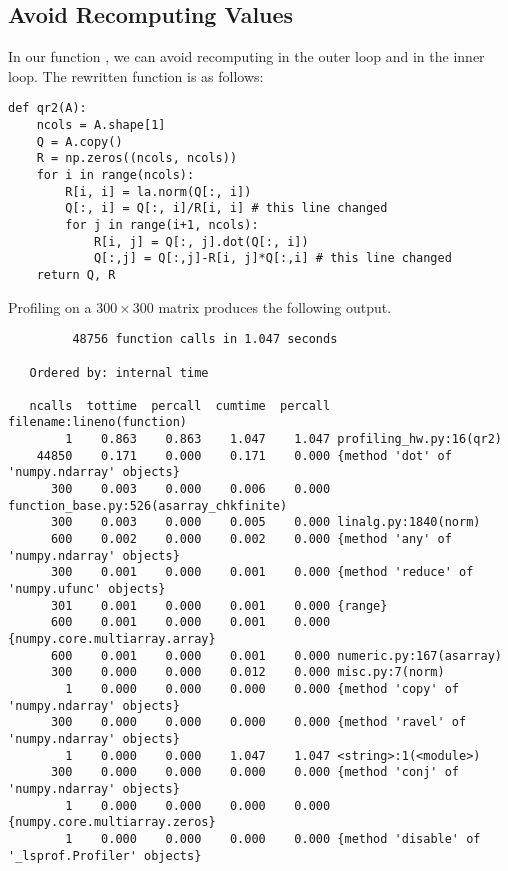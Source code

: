 \subsection*{Avoid Recomputing Values}
In our function , we can avoid recomputing  in the outer
loop and  in the inner loop.
The rewritten function is as follows:
\begin{lstlisting}
def qr2(A):
    ncols = A.shape[1]
    Q = A.copy()
    R = np.zeros((ncols, ncols))
    for i in range(ncols):
        R[i, i] = la.norm(Q[:, i])
        Q[:, i] = Q[:, i]/R[i, i] # this line changed
        for j in range(i+1, ncols):
            R[i, j] = Q[:, j].dot(Q[:, i])
            Q[:,j] = Q[:,j]-R[i, j]*Q[:,i] # this line changed
    return Q, R
\end{lstlisting}

Profiling  on a $300 \times 300$ matrix produces the following output.

{\scriptsize
\begin{verbatim}
         48756 function calls in 1.047 seconds

   Ordered by: internal time

   ncalls  tottime  percall  cumtime  percall filename:lineno(function)
        1    0.863    0.863    1.047    1.047 profiling_hw.py:16(qr2)
    44850    0.171    0.000    0.171    0.000 {method 'dot' of 'numpy.ndarray' objects}
      300    0.003    0.000    0.006    0.000 function_base.py:526(asarray_chkfinite)
      300    0.003    0.000    0.005    0.000 linalg.py:1840(norm)
      600    0.002    0.000    0.002    0.000 {method 'any' of 'numpy.ndarray' objects}
      300    0.001    0.000    0.001    0.000 {method 'reduce' of 'numpy.ufunc' objects}
      301    0.001    0.000    0.001    0.000 {range}
      600    0.001    0.000    0.001    0.000 {numpy.core.multiarray.array}
      600    0.001    0.000    0.001    0.000 numeric.py:167(asarray)
      300    0.000    0.000    0.012    0.000 misc.py:7(norm)
        1    0.000    0.000    0.000    0.000 {method 'copy' of 'numpy.ndarray' objects}
      300    0.000    0.000    0.000    0.000 {method 'ravel' of 'numpy.ndarray' objects}
        1    0.000    0.000    1.047    1.047 <string>:1(<module>)
      300    0.000    0.000    0.000    0.000 {method 'conj' of 'numpy.ndarray' objects}
        1    0.000    0.000    0.000    0.000 {numpy.core.multiarray.zeros}
        1    0.000    0.000    0.000    0.000 {method 'disable' of '_lsprof.Profiler' objects}
\end{verbatim}
}

